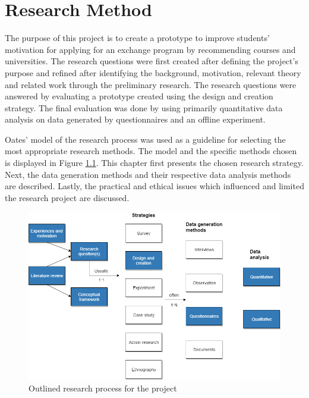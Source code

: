 
\chapter{Research Method}\label{chap:4}

The purpose of this project is to create a prototype to improve students' motivation for applying for an exchange program by recommending courses and universities. The research questions were first created after defining the project's purpose and refined after identifying the background, motivation, relevant theory and related work through the preliminary research. The research questions were answered by evaluating a prototype created using the design and creation strategy. The final evaluation was done by using primarily quantitative data analysis on data generated by questionnaires and an offline experiment.

Oates'\cite{oates2005researching} model of the research process was used as a guideline for selecting the most appropriate research methods. The model and the specific methods chosen is displayed in Figure \ref{fig:research_process}. This chapter first presents the chosen research strategy. Next, the data generation methods and their respective data analysis methods are described. Lastly, the practical and ethical issues which influenced and limited the research project are discussed. 

\begin{figure}[H]
    \centering
    \includegraphics[width=1\textwidth]{fig/research_process.png}
    \caption[Research process]{Outlined research process for the project}
    \label{fig:research_process}
\end{figure}

